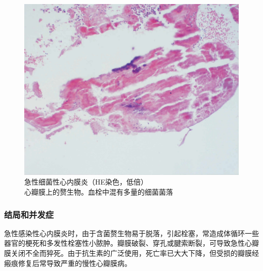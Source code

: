 \begin{figure}[!htbp]
    \centering
    \includegraphics{./images/Image00105.jpg}
    \captionsetup{justification=centering}
    \caption{急性细菌性心内膜炎（HE染色，低倍）\\{\small 心瓣膜上的赘生物。血栓中混有多量的细菌菌落}}
    \label{fig6-13}
\end{figure}



\subsubsection{结局和并发症}

急性感染性心内膜炎时，由于含菌赘生物易于脱落，引起栓塞，常造成体循环一些器官的梗死和多发性栓塞性小脓肿。瓣膜破裂、穿孔或腱索断裂，可导致急性心瓣膜关闭不全而猝死。由于抗生素的广泛使用，死亡率已大大下降，但受损的瓣膜经瘢痕修复后常导致严重的慢性心瓣膜病。

